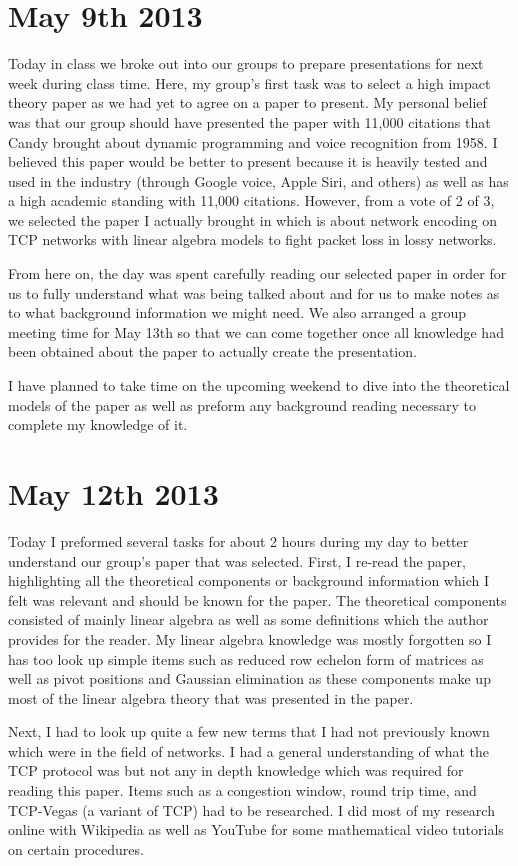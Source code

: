 \documentclass[conference]{IEEEtran}
\begin{document}
\section{May 9th 2013}
Today in class we broke out into our groups to prepare presentations for next week
during class time. Here, my group's first task was to select a high impact theory paper
as we had yet to agree on a paper to present. My personal belief was that our group
should have presented the paper with 11,000 citations that Candy brought about
dynamic programming and voice recognition from 1958. I believed this paper would be
better to present because it is heavily tested and used in the industry (through Google
voice, Apple Siri, and others) as well as has a high academic standing with 11,000
citations. However, from a vote of 2 of 3, we selected the paper I actually brought
in which is about network encoding on TCP networks with linear algebra models to fight
packet loss in lossy networks.

From here on, the day was spent carefully reading our selected paper in order for us
to fully understand what was being talked about and for us to make notes as to what
background information we might need. We also arranged a group meeting time for May 13th
so that we can come together once all knowledge had been obtained about the paper to
actually create the presentation.

I have planned to take time on the upcoming weekend to dive into the theoretical models
of the paper as well as preform any background reading necessary to complete my knowledge
of it.

\section{May 12th 2013}
Today I preformed several tasks for about 2 hours during my day to better understand
our group's paper that was selected. First, I re-read the paper, highlighting all the
theoretical components or background information which I felt was relevant and should
be known for the paper. The theoretical components consisted of mainly linear algebra
as well as some definitions which the author provides for the reader. My linear algebra
knowledge was mostly forgotten so I has too look up simple items such as reduced row
echelon form of matrices as well as pivot positions and Gaussian elimination as
these components make up most of the linear algebra theory that was presented in the paper.

Next, I had to look up quite a few new terms that I had not previously known which were
in the field of networks. I had a general understanding of what the TCP protocol was
but not any in depth knowledge which was required for reading this paper. Items such
as a congestion window, round trip time, and TCP-Vegas (a variant of TCP) had to be
researched. I did most of my research online with Wikipedia as well as YouTube for some
mathematical video tutorials on certain procedures.
\end{document}
